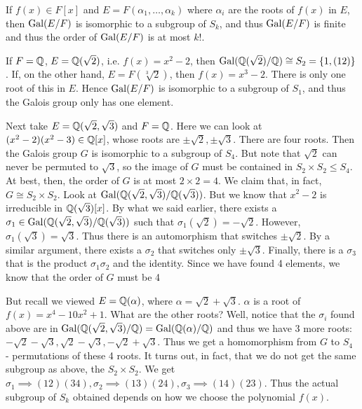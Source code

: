 \documentclass{../mathnotes}
\begin{document}
\begin{cor}
    If $f(x)\in F[x]$ and $E=F(\alpha_1,\ldots,\alpha_k)$ where $\alpha_i$ are the roots of $f(x)$ in $E$, then
    $\operatorname{Gal}(E/F)$ is isomorphic to a subgroup of $S_k$, and thus $\operatorname{Gal}(E/F)$ is finite and thus the order of $\operatorname{Gal}(E/F)$
    is at most $k!$.
\end{cor}

\begin{exmp}
    If $F=\mathbb{Q}$, $E=\mathbb{Q}(\sqrt{2})$, i.e. $f(x)=x^2-2$, then $\operatorname{Gal}(\mathbb{Q}(\sqrt{2})/\mathbb{Q})\cong S_2=\left\{ 1,(12) \right\}$. If, on the other hand,
    $E=F(\sqrt[3]{2})$, then $f(x)=x^3-2$. There is only one root of this in $E$. Hence $\operatorname{Gal}(E/F)$ is isomorphic to a subgroup of $S_1$,
    and thus the Galois group only has one element.

    Next take $E=\mathbb{Q}(\sqrt{2},\sqrt{3})$ and $F=\mathbb{Q}$. Here we can look at $(x^2-2)(x^2-3)\in\mathbb{Q}[x]$, whose roots are $\pm\sqrt{2},\pm\sqrt{3}$.
    There are four roots. Then the Galois group $G$ is isomorphic to a subgroup of $S_4$. But note that $\sqrt{2}$ can never be permuted to
    $\sqrt{3}$, so the image of $G$ must be contained in $S_2\times S_2\leq S_4$. At best, then, the order of $G$ is at most $2\times 2=4$.
    We claim that, in fact, $G\cong S_2\times S_2$. Look at $\operatorname{Gal}(\mathbb{Q}(\sqrt{2},\sqrt{3})/\mathbb{Q}(\sqrt{3}))$. But we know that $x^2-2$ is irreducible
    in $\mathbb{Q}(\sqrt{3})[x]$. By what we said earlier, there exists a $\sigma_1\in\operatorname{Gal}(\mathbb{Q}(\sqrt{2},\sqrt{3})/\mathbb{Q}(\sqrt{3}))$ such that $\sigma_1(\sqrt{2})=-\sqrt{2}$.
    However, $\sigma_1(\sqrt{3})=\sqrt{3}$. Thus there is an automorphism that switches $\pm\sqrt{2}$. By a similar argument, there exists a
    $\sigma_2$ that switches only $\pm\sqrt{3}$. Finally, there is a $\sigma_3$ that is the product $\sigma_1\sigma_2$ and the identity.
    Since we have found 4 elements, we know that the order of $G$ must be 4

    But recall we viewed $E=\mathbb{Q}(\alpha)$, where $\alpha=\sqrt{2}+\sqrt{3}$. $\alpha$ is a root of $f(x)=x^4-10x^2+1$. What are the other roots?
    Well, notice that the $\sigma_i$ found above are in $\operatorname{Gal}(\mathbb{Q}(\sqrt{2},\sqrt{3})/\mathbb{Q})=\operatorname{Gal}(\mathbb{Q}(\alpha)/\mathbb{Q})$ and thus we have 3 more roots:
    $-\sqrt{2}-\sqrt{3},\sqrt{2}-\sqrt{3}, -\sqrt{2}+\sqrt{3}$. Thus we get a homomorphism from $G$ to $S_4$ - permutations of these 4 roots.
    It turns out, in fact, that we do not get the same subgroup as above, the $S_2\times S_2$. We get $\sigma_1\implies(12)(34),
    \sigma_2\implies(13)(24),\sigma_3\implies(14)(23)$. Thus the actual subgroup of $S_k$ obtained depends on how we choose the polynomial
    $f(x)$.
\end{exmp}
\end{document}
